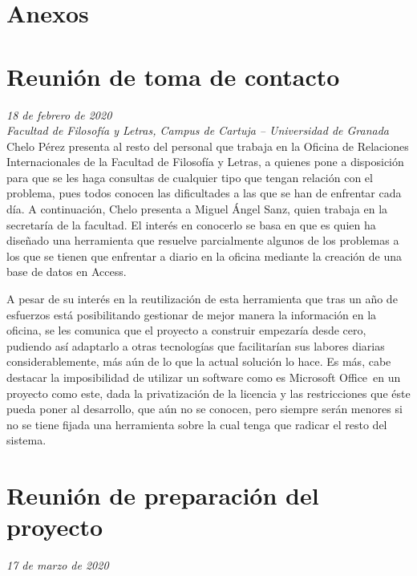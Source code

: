 \section*{Anexos}
\leavevmode
\begin{appendices}
	\section{Reunión de toma de contacto}
	\label{reunion1}
		\textit{18 de febrero de 2020}\\

		\textit{Facultad de Filosofía y Letras, Campus de Cartuja -- Universidad de Granada}\\
		
		Chelo Pérez presenta al resto del personal que trabaja en la Oficina de Relaciones Internacionales de la Facultad de Filosofía y Letras, a quienes pone a disposición para que se les haga consultas de cualquier tipo que tengan relación con el problema, pues todos conocen las dificultades a las que se han de enfrentar cada día. A continuación, Chelo presenta a Miguel Ángel Sanz, quien trabaja en la secretaría de la facultad. El interés en conocerlo se basa en que es quien ha diseñado una herramienta que resuelve parcialmente algunos de los problemas a los que se tienen que enfrentar a diario en la oficina mediante la creación de una base de datos en Access\textregistered.
		
		A pesar de su interés en la reutilización de esta herramienta que tras un año de esfuerzos está posibilitando gestionar de mejor manera la información en la oficina, se les comunica que el proyecto a construir empezaría desde cero, pudiendo así adaptarlo a otras tecnologías que facilitarían sus labores diarias considerablemente, más aún de lo que la actual solución lo hace. Es más, cabe destacar la imposibilidad de utilizar un software como es Microsoft Office\textregistered \ en un proyecto como este, dada la privatización de la licencia y las restricciones que éste pueda poner al desarrollo, que aún no se conocen, pero siempre serán menores si no se tiene fijada una herramienta sobre la cual tenga que radicar el resto del sistema.
		
	\section{Reunión de preparación del proyecto}
	\label{reunion2}
	
	\textit{17 de marzo de 2020}\\
	

\end{appendices}
